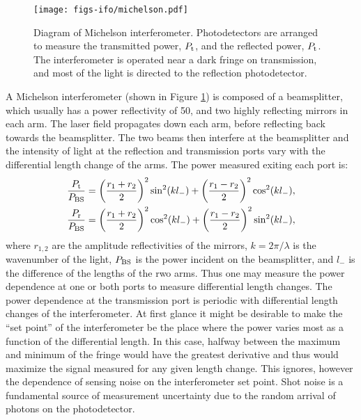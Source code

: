\begin{figure}
  \begin{center}
  \leavevmode
  \texttt{[image: figs-ifo/michelson.pdf]}
  \end{center}
  \caption[Diagram of a Michelson interferometer.]{Diagram of Michelson interferometer. Photodetectors are arranged to measure the transmitted power, $P_{\rm t}$, and the reflected power, $P_{\rm t}$. The interferometer is operated near a dark fringe on transmission, and most of the light is directed to the reflection photodetector.}
  \label{fig:michelson}
\end{figure}

A Michelson interferometer (shown in Figure \ref{fig:michelson}) is composed of a beamsplitter, which usually has a power reflectivity of 50\perc{}, and two highly reflecting mirrors in each arm. %
The laser field propagates down each arm, before reflecting back towards the beamsplitter. %
The two beams then interfere at the beamsplitter and the intensity of light at the reflection and transmission ports vary with the differential length change of the arms. %
The power measured exiting each port is:
\begin{align}
\frac{P_{\rm{t}}}{P_{\rm{BS}}} &= \left(\frac{r_1+r_2}{2}\right)^2\sin^2(kl_-)+\left(\frac{r_1-r_2}{2}\right)^2\cos^2(kl_-),\\
\frac{P_{\rm{r}}}{P_{\rm{BS}}} &= \left(\frac{r_1+r_2}{2}\right)^2\cos^2(kl_-)+\left(\frac{r_1-r_2}{2}\right)^2\sin^2(kl_-),
\end{align}
where $r_{1,2}$ are the amplitude reflectivities of the mirrors, $k=2\pi/\lambda$ is the wavenumber of the light, $P_{\rm{BS}}$ is the power incident on the beamsplitter, and $l_-$ is the difference of the lengths of the rwo arms. %
Thus one may measure the power dependence at one or both ports to measure differential length changes. %
The power dependence at the transmission port is periodic with differential length changes of the interferometer. %
At first glance it might be desirable to make the ``set point'' %
of the interferometer be the place where the power varies most as a function of the differential length. %
In this case, halfway between the maximum and minimum of the fringe would have the greatest derivative and thus would maximize the signal measured for any given length change. %
This ignores, however the dependence of sensing noise on the interferometer set point. %
Shot noise is a fundamental source of measurement uncertainty due to the random arrival of photons on the photodetector. %
